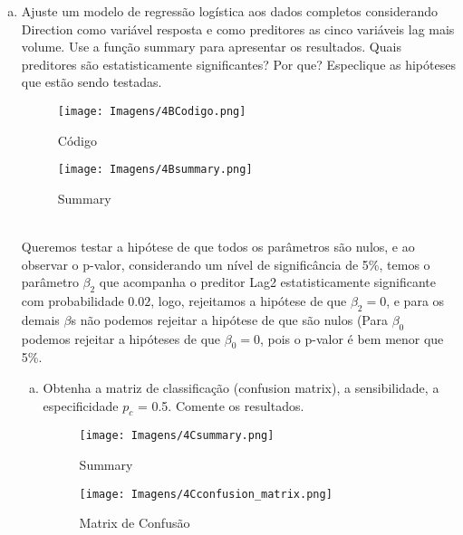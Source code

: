 \documentclass{article}
\begin{document}
\newpage
\begin{enumerate}[b.]
    \item  Ajuste um modelo de regressão logística aos dados completos considerando Direction como variável resposta e como preditores as cinco variáveis lag mais volume. Use a função summary para apresentar os resultados.
    Quais preditores são estatisticamente significantes? Por que? Especlique as hipóteses que estão sendo testadas.

    \begin{figure}[htb]
        \centering
        \texttt{[image: Imagens/4BCodigo.png]}
        \caption{Código}
        \label{fig:my_label}
    \end{figure}
    
    \begin{figure}[htb]
        \centering
        \texttt{[image: Imagens/4Bsummary.png]}
        \caption{Summary}
        \label{fig:my_label}
    \end{figure}

\\
Queremos testar a hipótese de que todos os parâmetros são nulos, e ao observar o p-valor, considerando um nível de significância de 5\%, temos o parâmetro $\beta_2$ que acompanha o preditor Lag2 estatisticamente significante com probabilidade $0.02$, logo, rejeitamos a hipótese de que $\beta_2 = 0$, e para os demais $\beta$s não podemos rejeitar a hipótese de que são nulos (Para $\beta_0$ podemos rejeitar a hipóteses de que $\beta_0 = 0$, pois o p-valor é bem menor que 5\%. 


\newpage
    \begin{enumerate}[c.]
        \item Obtenha a matriz de classificação (confusion matrix), a sensibilidade, a especificidade $p_c$ = 0.5.
        Comente os resultados.
        
        \begin{figure}[htb]
        \centering
        \texttt{[image: Imagens/4Csummary.png]}
        \caption{Summary}
        \label{fig:my_label}
        \end{figure}
        
        \begin{figure}[htb]
        \centering
        \texttt{[image: Imagens/4Cconfusion\_matrix.png]}
        \caption{Matrix de Confusão}
        \label{fig:my_label}
        \end{figure}
        

\end{enumerate}
\end{enumerate}
\end{document}
